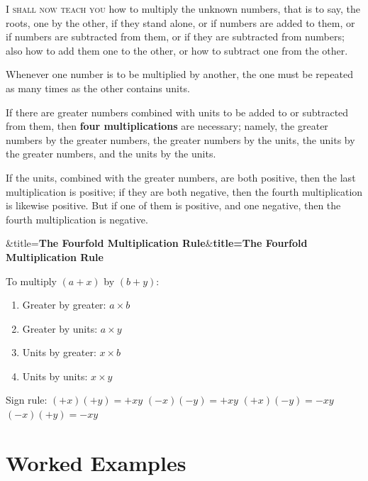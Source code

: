 \documentclass[11pt,a4paper]{book}
\newenvironment{transbox}[1][]{%
  \smallskip\par\noindent
  \begin{lrbox}{\transboxsave}
  \begin{minipage}{\dimexpr\linewidth-2\fboxsep-2\fboxrule\relax}%
  \setlength{\parskip}{0.3em}%
  \ifx&#1&\else\textbf{#1}\\[0.2cm]\fi
}{%
  \end{minipage}%
  \end{lrbox}
  \fcolorbox{rulecolor}{transbg}{\usebox{\transboxsave}}%
  \smallskip}
\begin{document}
\begin{minipage}[t]{0.48\textwidth}
\raggedright

\lettrine[lines=2, lhang=0.33, nindent=0em, findent=3pt, loversize=0.14]{
\textcolor{dropgold}{I}}{ shall now teach you} how to multiply the unknown numbers, that is to say, the roots, one by the other, if they stand alone, or if numbers are added to them, or if numbers are subtracted from them, or if they are subtracted from numbers; also how to add them one to the other, or how to subtract one from the other.

Whenever one number is to be multiplied by another, the one must be repeated as many times as the other contains units.

If there are greater numbers combined with units to be added to or subtracted from them, then \textbf{four multiplications} are necessary; namely, the greater numbers by the greater numbers, the greater numbers by the units, the units by the greater numbers, and the units by the units.

If the units, combined with the greater numbers, are both positive, then the last multiplication is positive; if they are both negative, then the fourth multiplication is likewise positive. But if one of them is positive, and one negative, then the fourth multiplication is negative.

\begin{transbox}[title={\textbf{The Fourfold Multiplication Rule}}]
To multiply $(a + x)$ by $(b + y)$:
\begin{enumerate}[label=\arabic*.,leftmargin=1.5em,topsep=1pt]
  \item Greater by greater: $a \times b$
  \item Greater by units: $a \times y$
  \item Units by greater: $x \times b$
  \item Units by units: $x \times y$
\end{enumerate}
Sign rule: $(+x)(+y) = +xy$ \quad $(-x)(-y) = +xy$ \quad $(+x)(-y) = -xy$ \quad $(-x)(+y) = -xy$
\end{transbox}

\end{minipage}
\vspace{0.3cm}

\newpage

\section*{Worked Examples}
\end{document}
